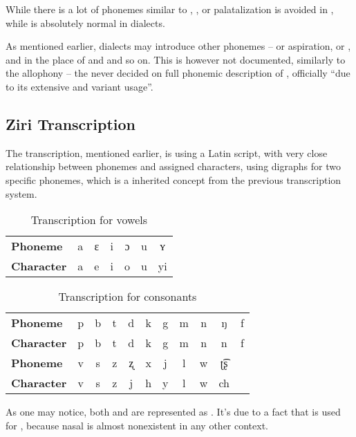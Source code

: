 While there is a lot of phonemes similar to , , or 
palatalization is avoided in , while is absolutely normal in
dialects.

As mentioned earlier, dialects may introduce other phonemes --  or
aspiration,  or ,  and  in the place of  and
 and so on. This is however not documented, similarly to the allophony --
the  never decided on
full phonemic description of \andro, officially ``due to its extensive and
variant usage''.

\subsection{Ziri Transcription}

The  transcription, mentioned earlier, is using a Latin script,
with very close relationship between phonemes and assigned characters, using
digraphs for two specific phonemes, which is a inherited concept from the
previous transcription system.

\begin{table}[ht]
    \centering
    \caption{Transcription for vowels}
    \begin{tabular}{llccccc}
        \textbf{Phoneme}   & a & ɛ & i & ɔ & u & ʏ  \\
        \textbf{Character} & a & e & i & o & u & yi
    \end{tabular}
    \label{tab:phonemes}
\end{table}

\begin{table}[ht]
    \centering
    \caption{Transcription for consonants}
    \begin{tabular}{lcccccccccc}
        \textbf{Phoneme}   & p & b & t & d & k & g & m & n & ŋ  & f \\
        \textbf{Character} & p & b & t & d & k & g & m & n & n  & f \\
        \textbf{Phoneme}   & v & s & z & ʐ & x & j & l & w & ʈ͡ʂ     \\
        \textbf{Character} & v & s & z & j & h & y & l & w & ch
    \end{tabular}
    \label{tab:chars}
\end{table}

As one may notice, both  and  are represented as . It's due to
a fact that  is used for , because nasal  is almost
nonexistent in any other context.

